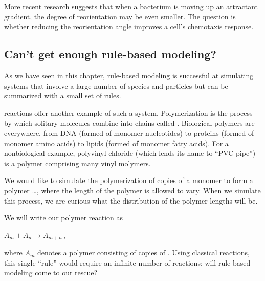 More recent research suggests that when a bacterium is moving up an attractant gradient, the degree of reorientation may be even smaller. The question is whether reducing the reorientation angle improves a cell's chemotaxis response.\\

\begin{exercise}\end{exercise}

\subsection{Can't get enough rule-based modeling?}

As we have seen in this chapter, rule-based modeling is successful at simulating systems that involve a large number of species and particles but can be summarized with a small set of rules.

 reactions offer another example of such a system. Polymerization is the process by which solitary  molecules combine into chains called . Biological polymers are everywhere, from DNA (formed of monomer nucleotides) to proteins (formed of monomer amino acids) to lipids (formed of monomer fatty acids). For a nonbiological example, polyvinyl chloride (which lends its name to ``PVC pipe'') is a polymer comprising many vinyl molymers.

We would like to simulate the polymerization of copies of a monomer  to form a polymer \ldots, where the length of the polymer is allowed to vary. When we simulate this process, we are curious what the distribution of the polymer lengths will be.

We will write our polymer reaction as

\begin{center}
$A_m + A_n \rightarrow A_{m+n}$\,,
\end{center}

\noindent where $A_m$ denotes a polymer consisting of  copies of . Using classical reactions, this single ``rule'' would require an infinite number of reactions; will rule-based modeling come to our rescue?

